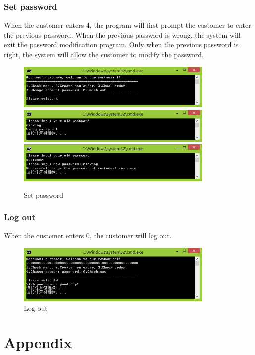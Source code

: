 \documentclass{article}
\begin{document}
\subsubsection{Set password}
When the customer enters 4, the program will first prompt the customer to enter the previous password. When the previous password is wrong, the system will exit the password modification program. Only when the previous password is right, the system will allow the customer to modify the password.
\begin{figure}[H]
    \centering
    \includegraphics[width=0.85\textwidth]{P/P4a.jpg}
    \includegraphics[width=0.85\textwidth]{P/P4b1.jpg}
    \includegraphics[width=0.85\textwidth]{P/P4b2.jpg}
    \caption{Set password}
\end{figure}

\subsubsection{Log out}
When the customer enters 0, the customer will log out.
\begin{figure}[H]
    \centering
    \includegraphics[width=0.85\textwidth]{login/customerexit.jpg}
    \caption{Log out}
\end{figure}






\section{Appendix}
\end{document}
